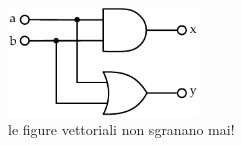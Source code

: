 \begin{figure}[tb]		%
	\begin{center}
		\includegraphics[width=0.45\textwidth]{./img/vector/and_or_circuit}
		\caption{le figure vettoriali non sgranano mai!}
		\label{fig:circuit}
	\end{center}
\end{figure}